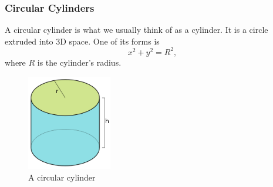 \subsubsection{Circular Cylinders}
\noindent
A circular cylinder is what we usually think of as a cylinder.
It is a circle extruded into 3D space.
One of its forms is 
\begin{equation*}
	x^2 + y^2 = R^2,
\end{equation*}
where $R$ is the cylinder's radius.

\begin{figure}[H]
	\centering
	\includegraphics[width=0.33\textwidth]{./differentialMultivariableCalculus/cylinder.png}
	\caption{A circular cylinder}
\end{figure}